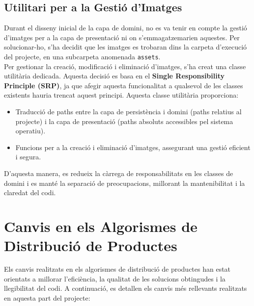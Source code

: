 \documentclass[a4paper,12pt]{report}
\begin{document}
\subsection{Utilitari per a la Gestió d'Imatges}
Durant el disseny inicial de la capa de domini, no es va tenir en compte la gestió d'imatges per a la capa de presentació ni on s'emmagatzemarien aquestes. Per solucionar-ho, s'ha decidit que les imatges es trobaran dins la carpeta d'execució del projecte, en una subcarpeta anomenada \texttt{assets}. \\

Per gestionar la creació, modificació i eliminació d'imatges, s'ha creat una classe utilitària dedicada. Aquesta decisió es basa en el \textbf{Single Responsibility Principle (SRP)}, ja que afegir aquesta funcionalitat a qualsevol de les classes existents hauria trencat aquest principi. Aquesta classe utilitària proporciona:
\begin{itemize}
	\item Traducció de paths entre la capa de persistència i domini (paths relatius al projecte) i la capa de presentació (paths absoluts accessibles pel sistema operatiu).
	\item Funcions per a la creació i eliminació d'imatges, assegurant una gestió eficient i segura.
\end{itemize}
D'aquesta manera, es redueix la càrrega de responsabilitats en les classes de domini i es manté la separació de preocupacions, millorant la mantenibilitat i la claredat del codi.

\newpage
\section {Canvis en els Algorismes de Distribució de Productes}

Els canvis realitzats en els algorismes de distribució de productes han estat orientats a millorar l'eficiència, la qualitat de les solucions obtingudes i la llegibilitat del codi. A continuació, es detallen els canvis més rellevants realitzats en aquesta part del projecte:
\end{document}

